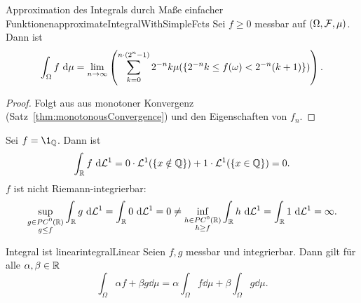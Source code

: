 \documentclass[language=ngerman]{../../Template/TemplateLecture}
\begin{document}
\begin{lem}{Approximation des Integrals durch Maße einfacher Funktionen}{approximateIntegralWithSimpleFcts}
    Sei $f \geq 0$ messbar auf $(\Omega, \mathcal{F}, \mu)$. Dann ist 
    \begin{equation}
        \int_\Omega f ~\mathrm{d}\mu = \lim_{n \to \infty} \left( \sum_{k = 0}^{n \cdot (2^n - 1)} 2^{-n} k \mu(\{2^{-n}k \leq f(\omega) < 2^{-n} (k+1)\})\right).
    \end{equation}
\end{lem}

\begin{proof}
    Folgt aus aus monotoner Konvergenz (Satz~\ref{thm:monotonousConvergence}) und den Eigenschaften von $f_n$.
\end{proof}

\begin{beispiel}
    Sei $f = \1_\IQ$. Dann ist 
    \begin{equation}
        \int_{\mathbb{R}} f~\mathrm{d}\mathcal{L}^1 = 0 \cdot \mathcal{L}^1(\{x \notin \mathbb{Q}\}) + 1 \cdot \mathcal{L}^1(\{x \in \mathbb{Q}\}) = 0.
    \end{equation}
    $f$ ist nicht Riemann-integrierbar:
    \begin{equation}
        \sup_{\substack{g \in PC^0(\mathbb{R}) \\ g \leq f}} \int_{\mathbb{R}} g ~\mathrm{d}\mathcal{L}^1 = \int_{\mathbb{R}} 0 ~\mathrm{d}\mathcal{L}^1 = 0\neq \inf_{\substack{h \in PC^0(\mathbb{R}) \\ h \geq f}} \int_{\mathbb{R}} h ~\mathrm{d}\mathcal{L}^1 = \int_{\mathbb{R}} 1 ~\mathrm{d}\mathcal{L}^1 = \infty.
    \end{equation}
\end{beispiel}

\begin{lem}{Integral ist linear}{integralLinear}
    Seien $f, g$ messbar und integrierbar. Dann gilt für alle $\alpha,\beta \in \mathbb{R}$
    \begin{equation}
        \int_\Omega \alpha f + \beta g \dd\mu = \alpha\int_\Omega f \dd\mu + \beta \int_\Omega g \dd\mu.
    \end{equation}
\end{lem}
\end{document}
